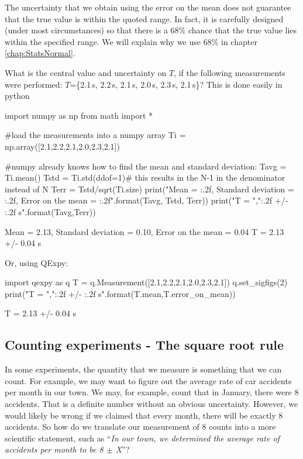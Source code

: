 The uncertainty that we obtain using the error on the mean does not guarantee that the true value is within the quoted range. In fact, it is carefully designed (under most circumstances) so that there is a 68\% chance that the true value lies within the specified range. We will explain why we use 68\% in chapter \ref{chap:StatsNormal}.

\begin{example}{What is the central value and uncertainty on $T$, if the following measurements were performed: $T$=\{2.1\,s, 2.2\,s, 2.1\,s, 2.0\,s, 2.3\,s, 2.1\,s\}?}
\label{ex:ChapUncertainties_mean}
This is done easily in python
\begin{python}[caption = Mean and std with numpy]
import numpy as np
from math import *

#load the measurements into a numpy array
Ti = np.array([2.1,2.2,2.1,2.0,2.3,2.1])

#numpy already knows how to find the mean and standard deviation:
Tavg = Ti.mean()
Tstd = Ti.std(ddof=1)# this results in the N-1 in the denominator instead of N
Terr = Tstd/sqrt(Ti.size)
print("Mean = {:.2f}, Standard deviation = {:.2f}, Error on the mean = {:.2f}".format(Tavg, Tstd, Terr))
print("T = ","{:.2f} +/- {:.2f} s".format(Tavg,Terr))
\end{python}
\begin{poutput}
Mean = 2.13, Standard deviation = 0.10, Error on the mean = 0.04
T =  2.13 +/- 0.04 s
\end{poutput}
Or, using QExpy:
\begin{python}[caption = Mean and std with QExpy]
import qexpy as q
T = q.Measurement([2.1,2.2,2.1,2.0,2.3,2.1])
q.set_sigfigs(2)
print("T = ","{:.2f} +/- {:.2f} s".format(T.mean,T.error_on_mean))
\end{python}
\begin{poutput}
T =  2.13 +/- 0.04 s
\end{poutput}

\end{example}


\subsection{Counting experiments - The square root rule}
\label{sec:countingError}
In some experiments, the quantity that we measure is something that we can count. For example, we may want to figure out the average rate of car accidents per month in our town. We may, for example, count that in January, there were 8 accidents. That is a definite number without an obvious uncertainty. However, we would likely be wrong if we claimed that every month, there will be exactly 8 accidents. So how do we translate our measurement of 8 counts into a more scientific statement, such as ``\textit{In our town, we determined the average rate of accidents per month to be 8 $\pm$ X}''? 

